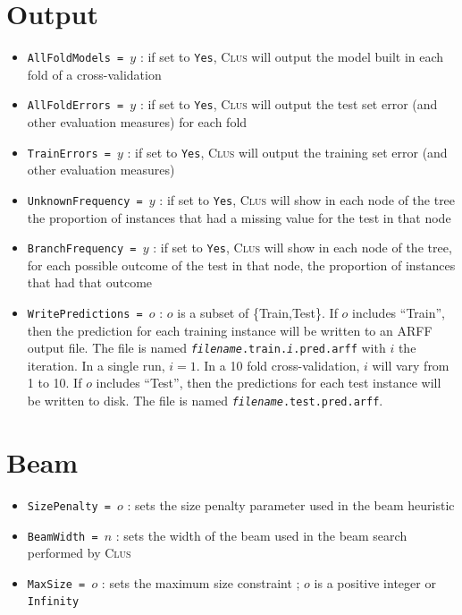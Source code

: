 \documentclass[a4paper]{report}
\newcommand{\clus}{\textsc{Clus}}
\begin{document}
\section{Output}

\begin{itemize}
\item {\tt AllFoldModels = $y$} : if set to {\tt Yes}, \clus{} will output the model built in each fold of a cross-validation
\item {\tt AllFoldErrors = $y$} : if set to {\tt Yes}, \clus{} will output the test set error (and other evaluation measures) for each fold
\item {\tt TrainErrors = $y$} : if set to {\tt Yes}, \clus{} will output the training set error (and other evaluation measures)
\item {\tt UnknownFrequency = $y$} : if set to {\tt Yes}, \clus{} will show in each node of the tree the proportion of instances that had a missing value for the test in that node
\item {\tt BranchFrequency = $y$} : if set to {\tt Yes}, \clus{} will show in each node of the tree, for each possible outcome of the test in that node, the proportion of instances that had that outcome
\item {\tt WritePredictions = $o$} : $o$ is a subset of \{Train,Test\}. If $o$ includes ``Train'', then the prediction for each training instance will be written to an ARFF output file. The file is named {\tt {\em filename}.train.{\em i}.pred.arff} with $i$ the iteration. In a single run, $i = 1$. In a 10 fold cross-validation, $i$ will vary from 1 to 10. If $o$ includes ``Test'', then the predictions for each test instance will be written to disk. The file is named {\tt {\em filename}.test.pred.arff}.
\end{itemize}

\section{Beam}

\begin{itemize}
\item {\tt SizePenalty = $o$} : sets the size penalty parameter used in the beam heuristic \cite{Kocev07a:proc}
\item {\tt BeamWidth = $n$} : sets the width of the beam used in the beam search performed by \clus{} \cite{Kocev07a:proc}
\item {\tt MaxSize = $o$} : sets the maximum size constraint \cite{Kocev07a:proc}; $o$ is a positive integer or {\tt Infinity}
\end{itemize}
\end{document}
